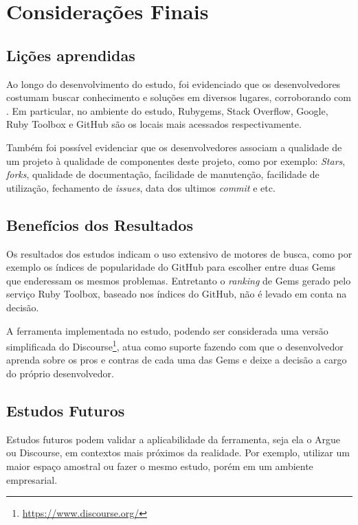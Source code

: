\chapter{Considerações Finais}

\section{Lições aprendidas}

Ao longo do desenvolvimento do estudo, foi evidenciado que os desenvolvedores costumam buscar conhecimento e soluções em diversos lugares, corroborando com \cite{parnin2012crowd}. Em particular, no ambiente do estudo, Rubygems, Stack Overflow, Google, Ruby Toolbox e GitHub são os locais mais acessados respectivamente.

Também foi possível evidenciar que os desenvolvedores associam a qualidade de um projeto à qualidade de componentes deste projeto, como por exemplo: \textit{Stars}, \textit{forks}, qualidade de documentação, facilidade de manutenção, facilidade de utilização, fechamento de \textit{issues}, data dos ultimos \textit{commit} e etc.

\section{Benefícios dos Resultados}

Os resultados dos estudos indicam o uso extensivo de motores de busca, como por exemplo os índices de popularidade do GitHub para escolher entre duas Gems que enderessam os mesmos problemas. Entretanto o \textit{ranking} de Gems gerado pelo serviço Ruby Toolbox, baseado nos índices do GitHub, não é levado em conta na decisão.

A ferramenta implementada no estudo, podendo ser considerada uma versão simplificada do Discourse\footnote{\url{https://www.discourse.org/}}, atua como suporte fazendo com que o desenvolvedor aprenda sobre os pros e contras de cada uma das Gems e deixe a decisão a cargo do próprio desenvolvedor.

\section{Estudos Futuros}

Estudos futuros podem validar a aplicabilidade da ferramenta, seja ela o Argue ou Discourse, em contextos mais próximos da realidade. Por exemplo, utilizar um maior espaço amostral ou fazer o mesmo estudo, porém em um ambiente empresarial.